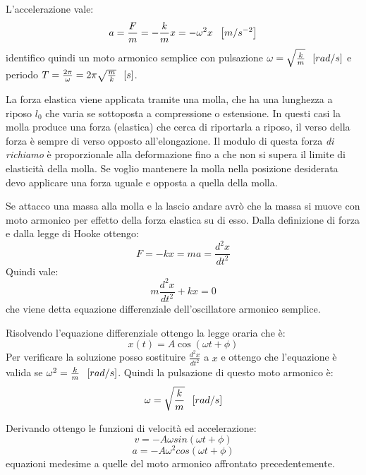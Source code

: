 \documentclass[class=book, crop=false, oneside, 12pt]{standalone}
\begin{document}
L'accelerazione vale:
\begin{equation}
    a = \frac{F}{m} = -\frac{k}{m}x = -\omega^2 x \hspace{0.2cm} \left[m/s^{-2}\right]
\end{equation}
identifico quindi un moto armonico semplice con pulsazione \(\omega = \sqrt{\frac{k}{m}} \hspace{0.2cm} \left[rad/s\right]\)  e periodo \(T = \frac{2 \pi}{\omega} = 2 \pi \sqrt{\frac{m}{k}} \hspace{0.2cm} \left[s\right]\).

La forza elastica viene applicata tramite una molla, che ha una lunghezza a riposo \(l_0\) che varia se sottoposta a compressione o estensione.
In questi casi la molla produce una forza (elastica) che cerca di riportarla a riposo, il verso della forza è sempre di verso opposto all'elongazione.
Il modulo di questa forza \emph{di richiamo} è proporzionale alla deformazione fino a che non si supera il limite di elasticità della molla.
Se voglio mantenere la molla nella posizione desiderata devo applicare una forza uguale e opposta a quella della molla.

Se attacco una massa alla molla e la lascio andare avrò che la massa si muove con moto armonico per effetto della forza elastica su di esso.
Dalla definizione di forza e dalla legge di Hooke ottengo:
\begin{equation*}
    F = -kx = m a = \frac{d^2 x}{dt^2}
\end{equation*}
Quindi vale:
\begin{equation}
    m \frac{d^2 x}{dt^2} + k x = 0
\end{equation}
che viene detta equazione differenziale dell'oscillatore armonico semplice.

Risolvendo l'equazione differenziale ottengo la legge oraria che è:
\begin{equation}
    x(t) = A \cos (\omega t + \phi)
\end{equation}
Per verificare la soluzione posso sostituire \(\frac{d^2x}{dt^2}\) a \(x\) e ottengo che l'equazione è valida se \(\omega^2 = \frac{k}{m} \hspace{0.2cm} \left[rad/s\right]\).
Quindi la pulsazione di questo moto armonico è:
\begin{equation}
    \omega = \sqrt{\frac{k}{m}} \hspace{0.2cm} \left[rad/s\right]
\end{equation}

Derivando ottengo le funzioni di velocità ed accelerazione:
\begin{equation*}
    v = -A \omega sin (\omega t + \phi)
\end{equation*}
\begin{equation*}
    a = - A \omega^2 cos (\omega t + \phi)
\end{equation*}
equazioni medesime a quelle del moto armonico affrontato precedentemente.
\end{document}
